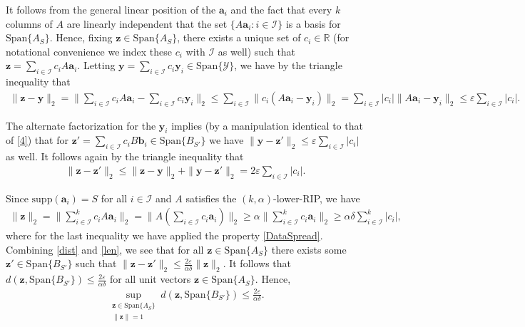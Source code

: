 \documentclass[journal,onecolumn]{IEEEtran}
\begin{document}
It follows from the general linear position of the $\mathbf{a}_i$ and the fact that every $k$ columns of $A$ are linearly independent that the set $\{A\mathbf{a}_i: i \in \mathcal{I}\}$ is a basis for $\text{Span}\{A_S\}$. Hence, fixing $\mathbf{z} \in \text{Span}\{A_S\}$, there exists a unique set of $c_i \in \mathbb{R}$ (for notational convenience we index these $c_i$ with $\mathcal{I}$ as well) such that $\mathbf{z} = \sum_{i \in \mathcal{I}} c_iA\mathbf{a}_i$. Letting $\mathbf{y} = \sum_{i \in \mathcal{I}} c_i\mathbf{y}_i  \in \text{Span}\{\mathcal{Y}\}$, we have by the triangle inequality that
\begin{align}\label{4}
\|\mathbf{z} - \mathbf{y}\|_2 = \| \sum_{i \in \mathcal{I}} c_i A \mathbf{a}_i -  \sum_{i \in \mathcal{I}} c_i \mathbf{y}_i \|_2 \leq \sum_{i \in \mathcal{I}} \| c_i (A\mathbf{a}_i - \mathbf{y}_i) \|_2 = \sum_{i \in \mathcal{I}} |c_i| \| A\mathbf{a}_i - \mathbf{y}_i \|_2 \leq \varepsilon \sum_{i \in \mathcal{I}} |c_i|.
\end{align}

The alternate factorization for the $\mathbf{y}_i$ implies (by a manipulation identical to that of \eqref{4}) that for $\mathbf{z}' = \sum_{i \in \mathcal{I}} c_i B\mathbf{b}_i \in \text{Span}\{B_{S'}\}$ we have $\|\mathbf{y} - \mathbf{z}'\|_2 \leq \varepsilon \sum_{i \in \mathcal{I}} |c_i|$ as well. It follows again by the triangle inequality that
\begin{align}\label{dist}
\|\mathbf{z} - \mathbf{z}'\|_2 \leq \|\mathbf{z} - \mathbf{y}\|_2 + \|\mathbf{y} - \mathbf{z}'\|_2 = 2 \varepsilon \sum_{i \in \mathcal{I}} |c_i|.
\end{align}

Since $\text{supp}(\mathbf{a}_i) = S$ for all $i \in \mathcal{I}$ and $A$ satisfies the $(k,\alpha)$-lower-RIP, we have 
\begin{align}\label{len}
\|\mathbf{z}\|_2 = \|\sum_{i \in \mathcal{I}}^k c_i A \mathbf{a}_i\|_2 
= \|A (\sum_{i \in \mathcal{I}} c_i \mathbf{a}_i) \|_2 
\geq \alpha \|\sum_{i \in \mathcal{I}}^k c_i \mathbf{a}_i\|_2 
\geq \alpha\delta \sum_{i \in \mathcal{I}}^k |c_i|,
\end{align}
%
where for the last inequality we have applied the property \eqref{DataSpread}. Combining \eqref{dist} and \eqref{len}, we see that for all $\mathbf{z} \in \text{Span}\{A_S\}$ there exists some $\mathbf{z}' \in \text{Span}\{B_{S'}\}$ such that $\|\mathbf{z} - \mathbf{z}'\|_2 \leq \frac{ 2 \varepsilon }{ \alpha \delta } \|\mathbf{z}\|_2$. It follows that $d(\mathbf{z}, \text{Span}\{B_{S'}\}) \leq \frac{ 2 \varepsilon }{ \alpha \delta }$ for all unit vectors $\mathbf{z} \in \text{Span}\{A_S\}$. Hence,
\begin{align}\label{ABSubspaceDistance}
\sup_{ \substack{ \mathbf{z} \in \text{Span}\{A_{S}\} \\ \|\mathbf{z}\| = 1} } d(\mathbf{z}, \text{Span}\{B_{S'}\}) \leq \frac{ 2 \varepsilon }{ \alpha \delta }.
\end{align}
\end{document}
